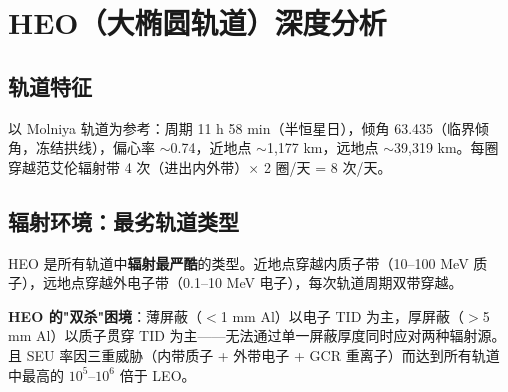 
\section{HEO（大椭圆轨道）深度分析}

\subsection{轨道特征}

以 Molniya 轨道为参考：周期 11 h 58 min（半恒星日），倾角 63.435\textdegree{}（临界倾角，冻结拱线），偏心率 $\sim$0.74，近地点 $\sim$1,177 km，远地点 $\sim$39,319 km。每圈穿越范艾伦辐射带 4 次（进出内外带）$\times$ 2 圈/天 = 8 次/天。

\subsection{辐射环境：最劣轨道类型}

HEO 是所有轨道中\textbf{辐射最严酷}的类型。近地点穿越内质子带（10--100 MeV 质子），远地点穿越外电子带（0.1--10 MeV 电子），每次轨道周期双带穿越。

\begin{table}[H]
\centering
\caption{HEO (Molniya) 辐射环境关键参数}
\label{tab:heo-rad}
\end{table}

\textbf{HEO 的"双杀"困境}：薄屏蔽（$<$1 mm Al）以电子 TID 为主，厚屏蔽（$>$5 mm Al）以质子贯穿 TID 为主——无法通过单一屏蔽厚度同时应对两种辐射源。且 SEU 率因三重威胁（内带质子 + 外带电子 + GCR 重离子）而达到所有轨道中最高的 $10^{5}$--$10^{6}$ 倍于 LEO。

